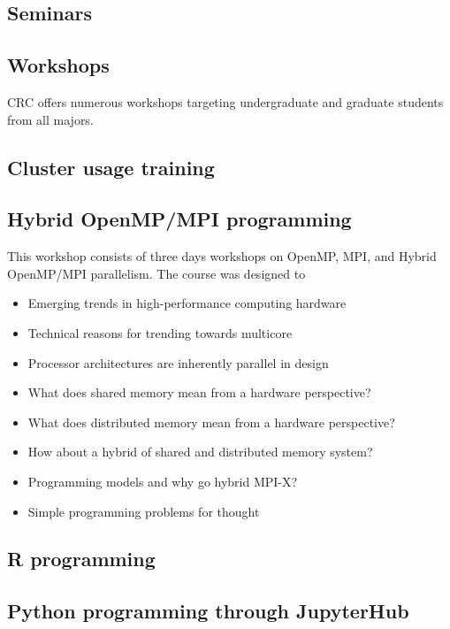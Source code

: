 \documentclass[conference]{IEEEtran}
\begin{document}
\subsection{Seminars}

\subsection{Workshops}

CRC offers numerous workshops targeting undergraduate and graduate students from all majors. 

\subsection*{Cluster usage training}

\subsection*{Hybrid OpenMP/MPI programming}
This workshop consists of three days workshops on OpenMP, MPI, and Hybrid OpenMP/MPI parallelism. The course was designed to 

\begin{itemize}
\item Emerging trends in high-performance computing hardware
\item Technical reasons for trending towards multicore
\item Processor architectures are inherently parallel in design
\item What does shared memory mean from a hardware perspective?
\item What does distributed memory mean from a hardware perspective?
\item How about  a hybrid of shared and distributed memory system?
\item Programming models and why go hybrid MPI-X?
\item Simple programming problems for thought
\end{itemize}


\subsection*{R programming}
\subsection*{Python programming through JupyterHub}
\end{document}
